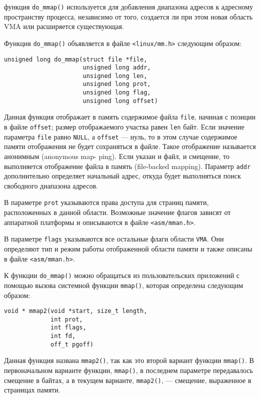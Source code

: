 \documentclass[12pt]{article}
\begin{document}
функция \verb!do_mmap()! используется для добавления диапазона адресов к адресному пространству процесса, 
независимо от того, создается ли при этом новая область VMA или расширяется существующая.

Функция \verb!do_mmap()! объявляется в файле \verb!<linux/mm.h>! следующим образом:

\begin{lstlisting}
unsigned long do_mmap(struct file *file, 
                      unsigned long addr,
                      unsigned long len, 
                      unsigned long prot,
                      unsigned long flag,
                      unsigned long offset)
\end{lstlisting}

Данная функция отображает в память содержимое файла \verb!file!, начиная с позиции в файле \verb!offset!; 
размер отображаемого участка равен \verb!len! байт. Если значение параметра \verb!file! равно \verb!NULL!, 
а \verb!offset! — нуль, то в этом случае содержимое памяти отображения не будет сохраняться в файле. Такое отображение называется анонимным (anonymous map- ping). Если указан и файл, и смещение, то выполняется отображение файла в память (file-backed mapping).
Параметр \verb!addr! дополнительно определяет начальный адрес, откуда будет выполняться поиск 
свободного диапазона адресов.

В параметре \verb!prot! указываются права доступа для страниц памяти, расположенных в 
данной области. Возможные значение флагов зависят от аппаратной платформы и описываются 
в файле \verb!<asm/mman.h>!.

В параметре \verb!flags! указываются все остальные флаги области \verb!VMA!.
Они определяют тип и режим работы отображенной области памяти и также описаны в файле \verb!<asm/mman.h>!.

К функции \verb!do_mmap()! можно обращаться из пользовательских приложений с 
помощью вызова системной функции \verb!mmap()!, которая определена следующим образом:

\begin{lstlisting}
void * mmap2(void *start, size_t length,
             int prot,
             int flags,
             int fd,
             off_t pgoff)
\end{lstlisting}

Данная функция названа \verb!mmap2()!, так как это второй вариант функции \verb!mmap()!. 
В первоначальном варианте функции, \verb!mmap()!, в последнем параметре передавалось 
смещение в байтах, а в текущем варианте, \verb!mmap2()!, — смещение, выраженное в страницах памяти.
\end{document}
